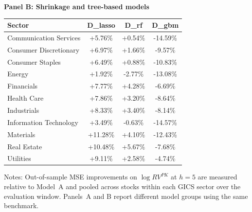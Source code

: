 \begin{table}[htbp]
\par\medskip
\textbf{Panel B: Shrinkage and tree-based models}\par\smallskip
\begin{tabular*}{\linewidth}{@{\extracolsep{\fill}}lccc@{}}
\toprule
Sector & D\_lasso & D\_rf & D\_gbm \\
\midrule
Communication Services & +5.76\% & +0.54\% & -14.59\% \\
Consumer Discretionary & +6.97\% & +1.66\% & -9.57\% \\
Consumer Staples & +6.49\% & +0.88\% & -10.83\% \\
Energy & +1.92\% & -2.77\% & -13.08\% \\
Financials & +7.77\% & +4.28\% & -6.69\% \\
Health Care & +7.86\% & +3.20\% & -8.64\% \\
Industrials & +8.33\% & +3.40\% & -8.14\% \\
Information Technology & +3.49\% & -0.63\% & -14.57\% \\
Materials & +11.28\% & +4.10\% & -12.43\% \\
Real Estate & +10.48\% & +5.67\% & -7.68\% \\
Utilities & +9.11\% & +2.58\% & -4.74\% \\
\bottomrule
\end{tabular*}
\begin{tablenotes}\small
\item Notes: Out-of-sample MSE improvements on $\log RV^{PK}$ at $h=5$
are measured relative to Model~A and pooled across stocks within each GICS
sector over the evaluation window. Panels~A and B report different model
groups using the same benchmark.
\end{tablenotes}
\end{table}

